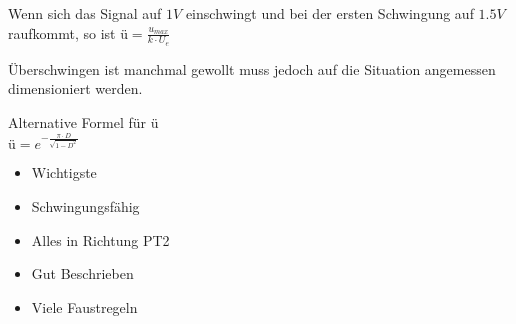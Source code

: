 \documentclass[letterpaper,10pt,english]{jupyterBook}
\begin{document}
\begin{DUlineblock}{0em}
\item[] 
\end{DUlineblock}

\sphinxAtStartPar
Wenn sich das Signal auf \(1V\) einschwingt und bei der ersten Schwingung auf \(1.5V\) raufkommt, so ist \(ü=\frac{u_{max}}{k\cdot U_e}\)

\sphinxAtStartPar
Überschwingen ist manchmal gewollt muss jedoch auf die Situation angemessen dimensioniert werden.

\begin{DUlineblock}{0em}
\item[] 
\end{DUlineblock}

\sphinxAtStartPar
Alternative Formel für \(ü\)\\
\(ü = e^{-\frac{\pi\cdot D}{\sqrt{1-D^2}}}\)

\begin{DUlineblock}{0em}
\item[] 
\end{DUlineblock}

\sphinxAtStartPar
{}

\sphinxAtStartPar
{}

\begin{DUlineblock}{0em}
\item[] 
\end{DUlineblock}
\begin{itemize}
\item {} 
\sphinxAtStartPar
Wichtigste

\item {} 
\sphinxAtStartPar
Schwingungsfähig

\item {} 
\sphinxAtStartPar
Alles in Richtung PT2

\item {} 
\sphinxAtStartPar
Gut Beschrieben

\item {} 
\sphinxAtStartPar
Viele Faustregeln

\end{itemize}

\begin{DUlineblock}{0em}
\item[] 
\end{DUlineblock}
\end{document}
